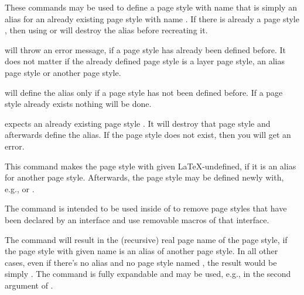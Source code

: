 \begin{Declaration}
\end{Declaration}
These commands may be used to define a page style with name  that is simply an alias for an already existing page style with
name . If there is already a page style
, then using  or
 will destroy the alias before recreating it.

 will throw an error message, if a page style
 has already been defined before. It does not
matter if the already defined page style is a layer page style, an alias page
style or another page style.

 will define the alias only if a page style
 has not been defined before. If a page style
 already exists nothing will be done.

 expects an already existing page style
. It will destroy that page style and afterwards
define the alias. If the page style  does not
exist, then you will get an error.%
\EndIndexGroup


\begin{Declaration}
\end{Declaration}
This command makes the page style with given 
\LaTeX-undefined, if it is an alias for another page style. Afterwards, the
page style may be defined newly with, e.g., 
or . 

The command is intended to be used inside of
 to remove page styles that have been
declared by an interface and use removable macros of that interface.%
\EndIndexGroup


\begin{Declaration}
\end{Declaration}
The command will result in the (recursive) real page name of the page style,
if the page style with given name  is an alias of
another page style. In all other cases, even if there's no alias and no page
style named , the result would be simply . The command is fully expandable and may be used, e.g., in the
second argument of .%
\EndIndexGroup


